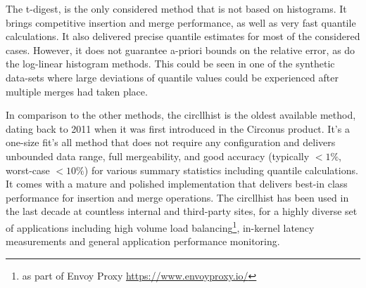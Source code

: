 \documentclass{article}
\theoremstyle{plain}
\theoremstyle{remark}
\begin{document}
The t-digest, is the only considered method that is not based on histograms. It brings competitive
insertion and merge performance, as well as very fast quantile calculations. It also delivered
precise quantile estimates for most of the considered cases. However, it does not guarantee a-priori
bounds on the relative error, as do the log-linear histogram methods. This could be seen in one of
the synthetic data-sets where large deviations of quantile values could be experienced after
multiple merges had taken place.

In comparison to the other methods, the circllhist is the oldest available method, dating back to
2011 when it was first introduced in the Circonus product. It's a one-size fit's all method that
does not require any configuration and delivers unbounded data range, full mergeability, and good
accuracy (typically $<1\%$, worst-case $<10\%$) for various summary statistics including quantile
calculations. It comes with a mature and polished implementation that delivers best-in class
performance for insertion and merge operations. The circllhist has been used in the last decade at
countless internal and third-party sites, for a highly diverse set of applications including high
volume load balancing\footnote{as part of Envoy Proxy \url{https://www.envoyproxy.io/}}, in-kernel
latency measurements\cite{HHBPF} and general application performance monitoring.
\end{document}
